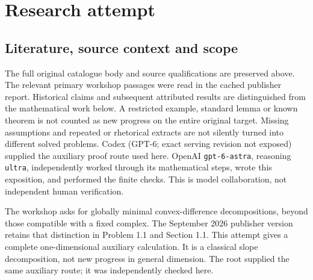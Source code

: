 \documentclass[11pt]{article}
\begin{document}
\section{Research attempt}
\subsection{Literature, source context and scope}
The full original catalogue body and source qualifications are preserved above. The relevant primary workshop passages were read in the cached publisher report. Historical claims and subsequent attributed results are distinguished from the mathematical work below. A restricted example, standard lemma or known theorem is not counted as new progress on the entire original target. Missing assumptions and repeated or rhetorical extracts are not silently turned into different solved problems.
Codex (GPT-6; exact serving revision not exposed) supplied the auxiliary proof route used here. OpenAI \texttt{gpt-6-astra}, reasoning \texttt{ultra}, independently worked through its mathematical steps, wrote this exposition, and performed the finite checks. This is model collaboration, not independent human verification.

The workshop asks for globally minimal convex-difference decompositions, beyond those compatible with a fixed complex. The September 2026 publisher version retains that distinction in Problem 1.1 and Section 1.1. This attempt gives a complete one-dimensional auxiliary calculation. It is a classical slope decomposition, not new progress in general dimension. The root supplied the same auxiliary route; it was independently checked here.
\end{document}
